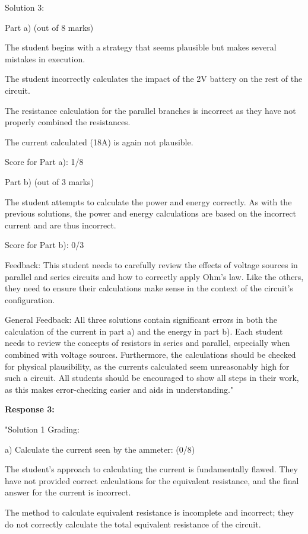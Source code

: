\documentclass[a4paper,11pt]{article}
\begin{document}
Solution 3:

Part a) (out of 8 marks)

The student begins with a strategy that seems plausible but makes several mistakes in execution.

The student incorrectly calculates the impact of the 2V battery on the rest of the circuit.

The resistance calculation for the parallel branches is incorrect as they have not properly combined the resistances.

The current calculated (18A) is again not plausible.

Score for Part a): 1/8

Part b) (out of 3 marks)

The student attempts to calculate the power and energy correctly.
As with the previous solutions, the power and energy calculations are based on the incorrect current and are thus incorrect.

Score for Part b): 0/3

Feedback:
This student needs to carefully review the effects of voltage sources in parallel and series circuits and how to correctly apply Ohm's law. Like the others, they need to ensure their calculations make sense in the context of the circuit's configuration.

General Feedback:
All three solutions contain significant errors in both the calculation of the current in part a) and the energy in part b). Each student needs to review the concepts of resistors in series and parallel, especially when combined with voltage sources. Furthermore, the calculations should be checked for physical plausibility, as the currents calculated seem unreasonably high for such a circuit. All students should be encouraged to show all steps in their work, as this makes error-checking easier and aids in understanding."

\textbf{Response 3:}

"Solution 1 Grading:

a) Calculate the current seen by the ammeter: (0/8)

The student's approach to calculating the current is fundamentally flawed. They have not provided correct calculations for the equivalent resistance, and the final answer for the current is incorrect.

The method to calculate equivalent resistance is incomplete and incorrect; they do not correctly calculate the total equivalent resistance of the circuit.
\end{document}
